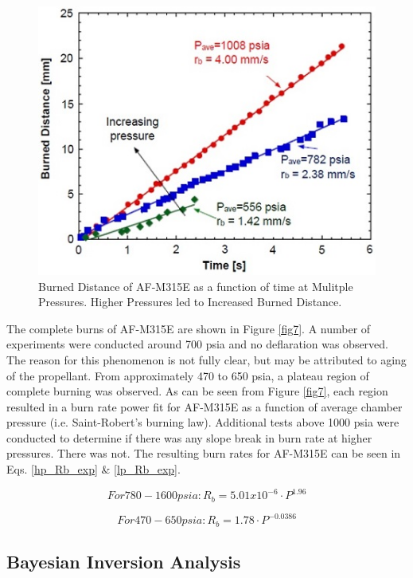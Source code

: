 \documentclass{article}
\begin{document}
\begin{figure}[htb!]
\centering
\includegraphics[width=0.25\textheight]{Figure_6.jpg}
\caption{Burned Distance of AF-M315E as a function of time at Mulitple Pressures. Higher Pressures led to Increased Burned Distance.}
\label{fig6}
\end{figure}

The complete burns of AF-M315E are shown in Figure \ref{fig7}. A number of experiments were conducted around 700
psia and no deflaration was observed. The reason for this phenomenon is not fully clear, but may be attributed to
aging of the propellant. From approximately 470 to 650 psia, a plateau region of complete burning was observed. As
can be seen from Figure \ref{fig7}, each region resulted in a burn rate power fit for AF-M315E as a function of 
average chamber pressure (i.e. Saint-Robert's burning law). Additional tests above 1000 psia were conducted to
determine if there was any slope break in burn rate at higher pressures. There was not. The resulting burn rates 
for AF-M315E can be seen in Eqs. \ref{hp_Rb_exp} \& \ref{lp_Rb_exp}. 

\begin{equation} \label{hp_Rb_exp}
For 780 - 1600 psia:	R_b=5.01x10^{-6} \cdot P^{1.96}
\end{equation}

\begin{equation} \label{lp_Rb_exp}
For 470 - 650 psia:	R_b=1.78 \cdot P^{-0.0386}
\end{equation}


\subsection{Bayesian Inversion Analysis} \label{resultsBayes}
\end{document}
